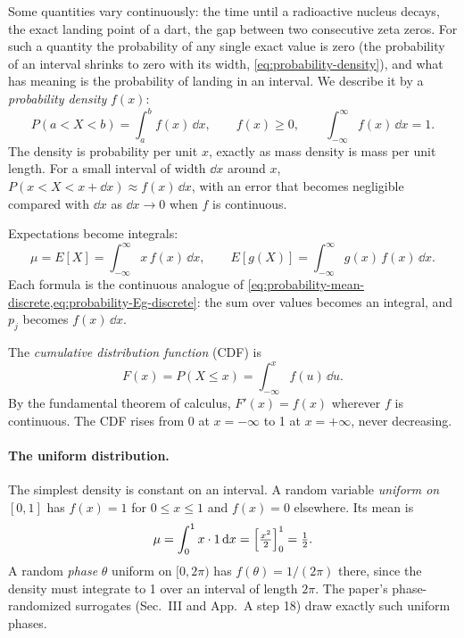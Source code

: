 Some quantities vary continuously: the time until a radioactive nucleus decays, the exact landing point of a dart, the gap between two consecutive zeta zeros. For such a quantity the probability of any single exact value is zero (the probability of an interval shrinks to zero with its width, \cref{eq:probability-density}), and what has meaning is the probability of landing in an interval. We describe it by a \emph{probability density} $f(x)$:
\begin{equation}
P(a< X< b) = \int_a^b f(x)\,\dd x,\qquad f(x)\ge0,\qquad \int_{-\infty}^{\infty}f(x)\,\dd x = 1 .
\label{eq:probability-density}
\end{equation}
The density is probability per unit $x$, exactly as mass density is mass per unit length. For a small interval of width $\dd x$ around $x$, $P(x<X<x+\dd x)\approx f(x)\,\dd x$, with an error that becomes negligible compared with $\dd x$ as $\dd x\to0$ when $f$ is continuous.

Expectations become integrals:
\begin{equation}
\mu=E[X] = \int_{-\infty}^{\infty} x\,f(x)\,\dd x,\qquad E[g(X)] = \int_{-\infty}^{\infty} g(x)\,f(x)\,\dd x .
\label{eq:probability-mean-cont}
\end{equation}
Each formula is the continuous analogue of \cref{eq:probability-mean-discrete,eq:probability-Eg-discrete}: the sum over values becomes an integral, and $p_j$ becomes $f(x)\,\dd x$.

The \emph{cumulative distribution function} (CDF) is
\begin{equation}
F(x) = P(X\le x) = \int_{-\infty}^{x} f(u)\,\dd u .
\label{eq:probability-cdf}
\end{equation}
By the fundamental theorem of calculus, $F'(x)=f(x)$ wherever $f$ is continuous. The CDF rises from 0 at $x=-\infty$ to 1 at $x=+\infty$, never decreasing.

\paragraph{The uniform distribution.} The simplest density is constant on an interval. A random variable \emph{uniform on} $[0,1]$ has $f(x)=1$ for $0\le x\le 1$ and $f(x)=0$ elsewhere. Its mean is
\[
\mu=\int_0^1 x\cdot 1\,\mathrm{d} x = \Bigl[\tfrac{x^2}{2}\Bigr]_0^1=\tfrac12 .
\]
A random \emph{phase} $\theta$ uniform on $[0,2\pi)$ has $f(\theta)=1/(2\pi)$ there, since the density must integrate to 1 over an interval of length $2\pi$. The paper's phase-randomized surrogates (Sec.~III and App.~A step 18) draw exactly such uniform phases.

